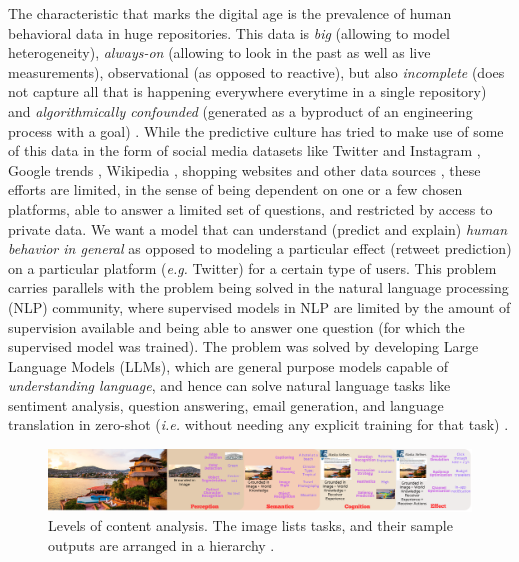 \documentclass[hidelinks,11pt,a4paper]{report}
\renewcommand{\cite}[1]{\citep{#1}}
\begin{document}
The characteristic that marks the digital age is the prevalence of human behavioral data in huge repositories. This data is \textit{big} (allowing to model heterogeneity), \textit{always-on} (allowing to look in the past as well as live measurements), observational (as opposed to reactive), but also \textit{incomplete} (does not capture all that is happening everywhere everytime in a single repository) and \textit{algorithmically confounded} (generated as a byproduct of an engineering process with a goal) \cite{salganik2019bit}. While the predictive culture has tried to make use of some of this data in the form of social media datasets like Twitter \cite{tumasjan2010predicting,asur2010predicting} and Instagram \cite{kim2020multimodal}, Google trends \cite{choi2012predicting,carriere2013nowcasting}, Wikipedia \cite{generous2014global,de2021general,mestyan2013early}, shopping websites \cite{krumme2013predictability,de2015unique} and other data sources \cite{brockmann2006scaling,song2010limits,miritello2013limited}, these efforts are limited, in the sense of being dependent on one or a few chosen platforms, able to answer a limited set of questions, and restricted by access to private data. We want a model that can understand (predict and explain) \textit{human behavior in general} as opposed to modeling a particular effect (retweet prediction) on a particular platform (\textit{e.g.} Twitter) for a certain type of users.
This problem carries parallels with the problem being solved in the natural language processing (NLP) community, where supervised models in NLP are limited by the amount of supervision available and being able to answer one question (for which the supervised model was trained). The problem was solved by developing Large Language Models (LLMs), which are general purpose models capable of \textit{understanding language}, and hence can solve natural language tasks like sentiment analysis, question answering, email generation, and language translation in zero-shot (\textit{i.e.} without needing any explicit training for that task) \cite{devlin2018bert,brown2020language,radford2018improving,raffel2020exploring,radford2019language}.





\begin{figure}[h]
  \centering
  \includegraphics[width=1.0\textwidth]{images/levels of analysis.pdf}
  \caption{Levels of content analysis. The image lists tasks, and their sample outputs are arranged in a hierarchy \cite{shannon-weaver-1949}.}
\end{figure}
\end{document}
